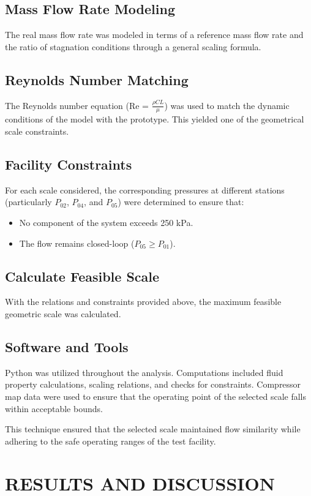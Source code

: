 \documentclass[12pt,a4paper]{article}
\begin{document}
\subsection*{Mass Flow Rate Modeling}
The real mass flow rate was modeled in terms of a reference mass flow rate and the ratio of stagnation conditions through a general scaling formula.

\subsection*{Reynolds Number Matching}
The Reynolds number equation (Re = $\frac{\rho C L}{\mu}$) was used to match the dynamic conditions of the model with the prototype. This yielded one of the geometrical scale constraints.

\subsection*{Facility Constraints}
For each scale considered, the corresponding pressures at different stations (particularly $P_{02}$, $P_{04}$, and $P_{05}$) were determined to ensure that:
\begin{itemize}
    \item No component of the system exceeds 250 kPa.
    \item The flow remains closed-loop ($P_{05} \geq P_{01}$).
\end{itemize}

\subsection*{Calculate Feasible Scale}
With the relations and constraints provided above, the maximum feasible geometric scale was calculated.

\subsection*{Software and Tools}
Python was utilized throughout the analysis. Computations included fluid property calculations, scaling relations, and checks for constraints. Compressor map data were used to ensure that the operating point of the selected scale falls within acceptable bounds.

This technique ensured that the selected scale maintained flow similarity while adhering to the safe operating ranges of the test facility.

\section*{RESULTS AND DISCUSSION}
\end{document}
